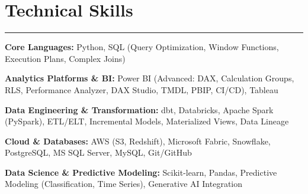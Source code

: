 \documentclass[10pt]{article}
\begin{document}
\vspace{0.4cm}


\vspace{-0.5cm}

\section*{Technical Skills}
\vspace{-0.25cm}
\hrule 
\vspace{0.3cm}



    \noindent\textbf{Core Languages:}
    Python, SQL (Query Optimization, Window Functions, Execution Plans, Complex Joins)

    \vspace{0.15cm}
    \noindent\textbf{Analytics Platforms \& BI:}
    Power BI (Advanced: DAX, Calculation Groups, RLS, Performance Analyzer, DAX Studio, TMDL, PBIP, CI/CD), Tableau

    \vspace{0.15cm}
    \noindent\textbf{Data Engineering \& Transformation:}
    dbt, Databricks, Apache Spark (PySpark), ETL/ELT, Incremental Models, Materialized Views, Data Lineage

    \vspace{0.15cm}
    \noindent\textbf{Cloud \& Databases:}
    AWS (S3, Redshift), Microsoft Fabric, Snowflake, PostgreSQL, MS SQL Server, MySQL, Git/GitHub

    \vspace{0.15cm}
    \noindent\textbf{Data Science \& Predictive Modeling:}
    Scikit-learn, Pandas, Predictive Modeling (Classification, Time Series), Generative AI Integration
\end{document}
